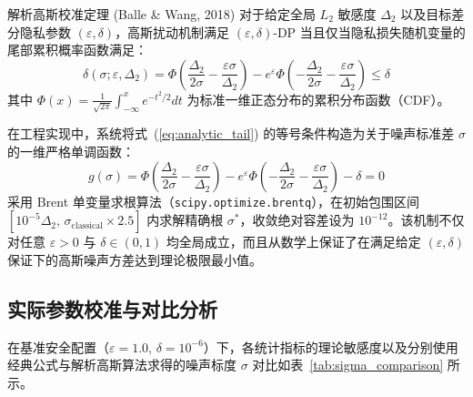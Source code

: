 \begin{techbox}{解析高斯校准定理 (Balle \& Wang, 2018)}
对于给定全局 $L_2$ 敏感度 $\Delta_2$ 以及目标差分隐私参数 $(\varepsilon, \delta)$，高斯扰动机制满足 $(\varepsilon, \delta)$-DP 当且仅当隐私损失随机变量的尾部累积概率函数满足：
\begin{equation}
  \label{eq:analytic_tail}
  \delta(\sigma; \varepsilon, \Delta_2) = \Phi\left(\frac{\Delta_2}{2\sigma} - \frac{\varepsilon\sigma}{\Delta_2}\right) - e^\varepsilon \Phi\left(-\frac{\Delta_2}{2\sigma} - \frac{\varepsilon\sigma}{\Delta_2}\right) \le \delta
\end{equation}
其中 $\Phi(x) = \frac{1}{\sqrt{2\pi}} \int_{-\infty}^x e^{-t^2/2} dt$ 为标准一维正态分布的累积分布函数（CDF）。
\end{techbox}

在工程实现中，系统将式~(\ref{eq:analytic_tail}) 的等号条件构造为关于噪声标准差 $\sigma$ 的一维严格单调函数：
\begin{equation}
  g(\sigma) = \Phi\left(\frac{\Delta_2}{2\sigma} - \frac{\varepsilon\sigma}{\Delta_2}\right) - e^\varepsilon \Phi\left(-\frac{\Delta_2}{2\sigma} - \frac{\varepsilon\sigma}{\Delta_2}\right) - \delta = 0
\end{equation}
采用 Brent 单变量求根算法（\texttt{scipy.optimize.}\allowbreak\texttt{brentq}），在初始包围区间 $[10^{-5}\Delta_2, \, \sigma_{\text{classical}} \times 2.5]$ 内求解精确根 $\sigma^*$，收敛绝对容差设为 $10^{-12}$。该机制不仅对任意 $\varepsilon > 0$ 与 $\delta \in (0, 1)$ 均全局成立，而且从数学上保证了在满足给定 $(\varepsilon, \delta)$ 保证下的高斯噪声方差达到理论极限最小值。

\subsection{实际参数校准与对比分析}
在基准安全配置（$\varepsilon = 1.0, \, \delta = 10^{-6}$）下，各统计指标的理论敏感度以及分别使用经典公式与解析高斯算法求得的噪声标度 $\sigma$ 对比如表~\ref{tab:sigma_comparison} 所示。

